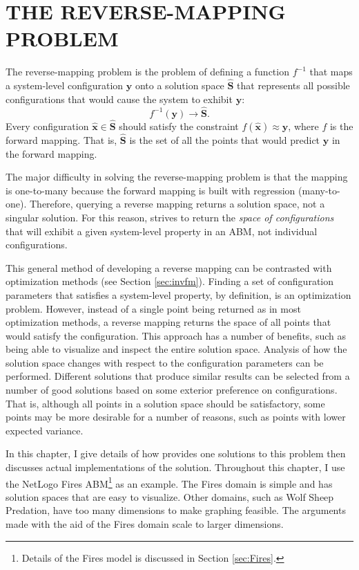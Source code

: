 \chapter{THE REVERSE-MAPPING PROBLEM}
\thispagestyle{plain}

\label{ReverseMapping}

The reverse-mapping problem is the problem of defining a function $f^{-1}$ that maps a system-level configuration $\mathbf y$ onto a solution space $\hat{\mathbf S}$ that represents all possible configurations that would cause the system to exhibit $\mathbf y$:
   \[ f^{-1}(\mathbf y) \rightarrow \hat{\mathbf S}. \]
Every configuration $\hat {\mathbf x} \in \hat {\mathbf S}$ should satisfy the constraint $f(\hat{\mathbf x}) \approx \mathbf y$, where $f$ is the forward mapping.
That is, $\hat{\mathbf S}$ is the set of all the points that would predict $\mathbf y$ in the forward mapping.

The major difficulty in solving the reverse-mapping problem is that the mapping is one-to-many because the forward mapping is built with regression (many-to-one).
Therefore, querying a reverse mapping returns a solution space, not a singular solution.
For this reason, \fw strives to return the \textit{space of configurations} that will exhibit a given system-level property in an ABM, not individual configurations.

This general method of developing a reverse mapping can be contrasted with optimization methods (see Section \ref{sec:invfm}).
Finding a set of configuration parameters that satisfies a system-level property, by definition, is an optimization problem.
However, instead of a single point being returned as in most optimization methods, a reverse mapping returns the space of all points that would satisfy the configuration.
This approach has a number of benefits, such as being able to visualize and inspect the entire solution space.
Analysis of how the solution space changes with respect to the configuration parameters can be performed.
Different solutions that produce similar results can be selected from a number of good solutions based on some exterior preference on configurations.
That is, although all points in a solution space should be satisfactory, some points may be more desirable for a number of reasons, such as points with lower expected variance.

In this chapter, I give details of how \fw provides one solutions to this problem then discusses actual implementations of the solution.
Throughout this chapter, I use the NetLogo Fires ABM\footnote{Details of the Fires model is discussed in Section \ref{sec:Fires}.} as an example.
The Fires domain is simple and has solution spaces that are easy to visualize.
Other domains, such as Wolf Sheep Predation, have too many dimensions to make graphing feasible.
The arguments made with the aid of the Fires domain scale to larger dimensions.



